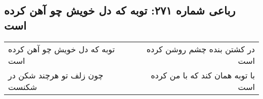 \begin{center}
\section*{رباعی شماره ۲۷۱: توبه که دل خویش چو آهن کرده است}
\label{sec:0271}
\begin{longtable}{l p{0.5cm} r}
توبه که دل خویش چو آهن کرده است
&&
در کشتن بنده چشم روشن کرده است
\\
چون زلف تو هرچند شکن در شکنست
&&
با توبه همان کند که با من کرده است
\\
\end{longtable}
\end{center}
